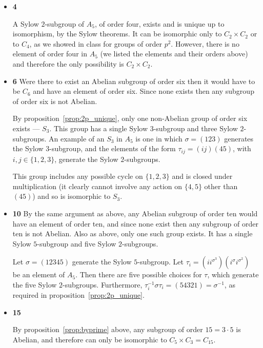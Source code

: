 \documentclass[11pt]{article} \usepackage{amssymb}
\begin{document}
\begin{enumerate}
\begin{itemize}
    \item {\bf 4}
      
      A Sylow $2$-subgroup of $A_5$, of order four,
      exists and is unique up to isomorphism, by the Sylow theorems. It can
      be isomorphic only to $C_2\times C_2$ or to $C_4$, as we showed in class
      for groups of order $p^2$. However, there is no element of order four
      in $A_5$ (we listed the elements and their orders above) and therefore
      the only possibility is $C_2 \times C_2$. 
      
    \item {\bf 6}
      Were there to exist an Abelian subgroup of order six then it would have
      to be $C_6$ and have an element of order six. Since none exists then
      any subgroup of order six is not Abelian.
      
      By proposition~\ref{prop:2p_unique}, only one non-Abelian group of order 
      six exists --- $S_3$. This group has
      a single Sylow $3$-subgroup and three Sylow $2$-subgroups. An example
      of an $S_3$ in $A_5$ is one in which $\sigma=(1 2 3)$ generates the Sylow
      $3$-subgroup, and the elements of the form $\tau_{ij}=(ij)(45)$, with 
      $i,j \in \{1,2,3\}$, generate the Sylow $2$-subgroups. 

      This group includes any possible cycle on $\{1,2,3\}$ and is closed under
      multiplication (it clearly cannot involve any action on $\{4,5\}$ other
      than $(45)$) and so is isomorphic to $S_3$.

    \item {\bf 10}
      By the same argument as above, any Abelian subgroup of order ten would
      have an element of order ten, and since none exist then  
      any subgroup of order ten is not Abelian. Also as above, only one such
      group exists. It has a single Sylow $5$-subgroup and five Sylow 
      $2$-subgroups.

      Let $\sigma=(12345)$ generate the Sylow 
      $5$-subgroup. Let 
      $\tau_i=\left(ii^{\sigma^3}\right)\left(i^{\sigma}i^{\sigma^2}\right)$ 
      be an element of $A_5$. Then there are five possible
      choices for $\tau$, which generate the five Sylow $2$-subgroups. Furthermore, 
      $\tau_i^{-1}\sigma\tau_i=(54321)=\sigma^{-1}$, as 
      required in proposition~\ref{prop:2p_unique}.

    \item {\bf 15}
      
      By proposition~\ref{prop:byprime} above, any subgroup of order $15=3\cdot 5$
      is Abelian, and therefore can only be isomorphic to 
      $C_5\times C_3=C_{15}$. 


\end{itemize}
\end{enumerate}
\end{document}
